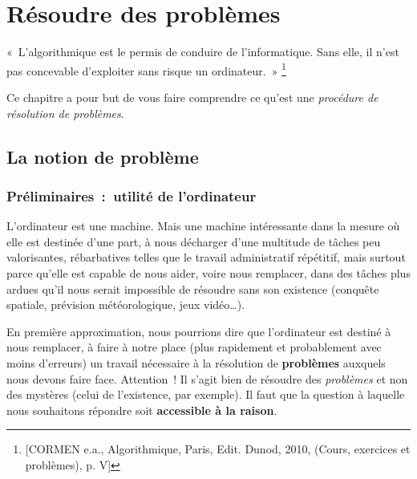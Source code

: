 \chapter{Résoudre des problèmes}
\label{refpblm}

	\begin{Exergue}
		«~L’algorithmique est le permis de conduire de l’informatique.
		Sans elle, il n’est pas concevable d’exploiter sans risque un ordinateur.~»
		\footnote{[CORMEN e.a., Algorithmique, Paris, Edit. Dunod, 2010, (Cours, 
		exercices et problèmes), p. V] }
	\end{Exergue}

	Ce chapitre a pour but
	de vous faire comprendre ce qu’est une 
	\emph{procédure de résolution de problèmes}.

	\minitoc

	\section{La notion de problème}
	
		\subsection{Préliminaires~:~utilité de l’ordinateur}
		
			L’ordinateur est une machine. 
			Mais une machine intéressante dans la mesure 
			où elle est destinée d’une part, 
			à nous décharger d’une multitude de tâches peu valorisantes, 
			rébarbatives telles que le travail administratif répétitif, 
			mais surtout parce qu’elle est capable de nous aider, 
			voire nous remplacer, dans des tâches plus ardues 
			qu’il nous serait impossible de résoudre sans son existence 
			(conquête spatiale, prévision météorologique, jeux vidéo\dots).
			
			En première approximation, nous pourrions dire que l’ordinateur est
			destiné à nous remplacer, à faire à notre place (plus rapidement et
			probablement avec moins d’erreurs) un travail nécessaire à la
			résolution de \textbf{problèmes} auxquels nous devons faire face.
			Attention~! Il s’agit bien de résoudre des \textit{problèmes} et non
			des mystères (celui de l’existence, par exemple).  Il faut que la
			question à laquelle nous souhaitons répondre soit \textbf{accessible
			à la raison}.
	
